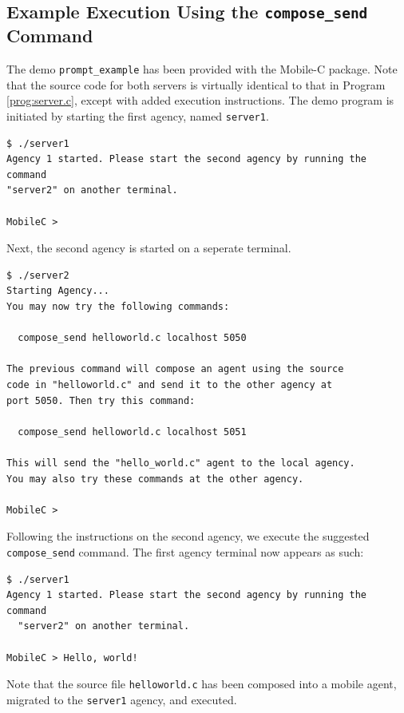 \documentclass[11pt]{report}
\begin{document}
\subsection{Example Execution Using the \texttt{compose\_send} Command}
The demo \texttt{prompt\_example} has been provided with the Mobile-C
package. Note that the source code for both servers is virtually identical to
that in Program \ref{prog:server.c}, except with added execution
instructions.
The demo program is initiated by starting the first agency, named
\texttt{server1}.
\begin{verbatim}
$ ./server1
Agency 1 started. Please start the second agency by running the command
"server2" on another terminal.

MobileC >
\end{verbatim}
Next, the second agency is started on a seperate terminal.
\begin{verbatim}
$ ./server2
Starting Agency...
You may now try the following commands:

  compose_send helloworld.c localhost 5050

The previous command will compose an agent using the source
code in "helloworld.c" and send it to the other agency at
port 5050. Then try this command:

  compose_send helloworld.c localhost 5051

This will send the "hello_world.c" agent to the local agency.
You may also try these commands at the other agency.

MobileC >
\end{verbatim}
Following the instructions on the second agency, we execute the 
suggested \texttt{compose\_send} command. The first agency terminal
now appears as such:
\begin{verbatim}
$ ./server1
Agency 1 started. Please start the second agency by running the command
  "server2" on another terminal.

MobileC > Hello, world!
\end{verbatim}
Note that the source file \texttt{helloworld.c} has been composed into a 
mobile agent, migrated to the \texttt{server1} agency, and executed.
\end{document}

